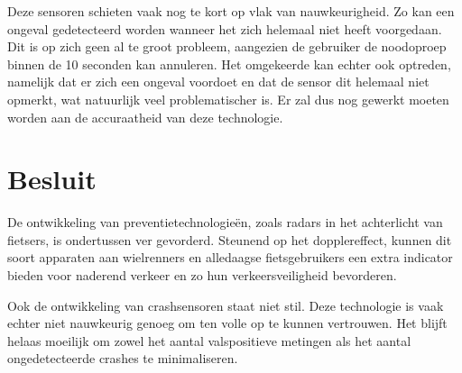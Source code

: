 \documentclass[kulak]{kulakarticle} %
\begin{document}
Deze sensoren schieten vaak nog te kort op vlak van nauwkeurigheid. Zo kan een ongeval gedetecteerd worden wanneer het zich helemaal niet heeft voorgedaan. Dit is op zich geen al te groot probleem, aangezien de gebruiker de noodoproep binnen de 10 seconden kan annuleren. Het omgekeerde kan echter ook optreden, namelijk dat er zich een ongeval voordoet en dat de sensor dit helemaal niet opmerkt, wat natuurlijk veel problematischer is. Er zal dus nog gewerkt moeten worden aan de accuraatheid van deze technologie.

\section*{Besluit}

De ontwikkeling van preventietechnologieën, zoals radars in het achterlicht van fietsers, is ondertussen ver gevorderd. Steunend op het dopplereffect, kunnen dit soort apparaten aan wielrenners en alledaagse fietsgebruikers een extra indicator bieden voor naderend verkeer en zo hun verkeersveiligheid bevorderen.

Ook de ontwikkeling van crashsensoren staat niet stil. Deze technologie is vaak echter niet nauwkeurig genoeg om ten volle op te kunnen vertrouwen. Het blijft helaas moeilijk om zowel het aantal valspositieve metingen als het aantal ongedetecteerde crashes te minimaliseren.

\nocite{TabeiFatemehsadat2021ADSf}



\end{document}

